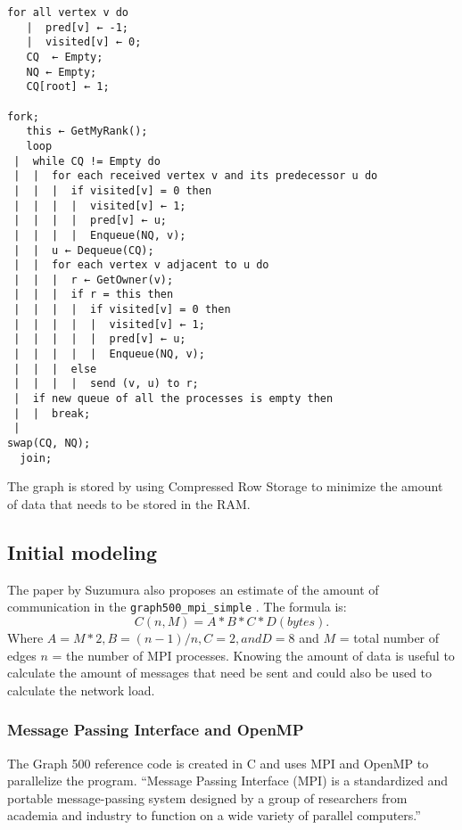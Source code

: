 \begin{lstlisting}[label={code:pseudo-simple},caption={Pseudo code taken from paper \cite{suzumura2011performance}}]
for all vertex v do 
   |  pred[v] ← -1; 
   |  visited[v] ← 0; 
   CQ  ← Empty; 
   NQ ← Empty; 
   CQ[root] ← 1; 
   
fork;
   this ← GetMyRank(); 
   loop 
 |  while CQ != Empty do 
 |  |  for each received vertex v and its predecessor u do 
 |  |  |  if visited[v] = 0 then 
 |  |  |  |  visited[v] ← 1; 
 |  |  |  |  pred[v] ← u; 
 |  |  |  |  Enqueue(NQ, v); 
 |  |  u ← Dequeue(CQ); 
 |  |  for each vertex v adjacent to u do 
 |  |  |  r ← GetOwner(v); 
 |  |  |  if r = this then 
 |  |  |  |  if visited[v] = 0 then 
 |  |  |  |  |  visited[v] ← 1; 
 |  |  |  |  |  pred[v] ← u; 
 |  |  |  |  |  Enqueue(NQ, v); 
 |  |  |  else 
 |  |  |  |  send (v, u) to r; 
 |  if new queue of all the processes is empty then 
 |  |  break; 
 |  
swap(CQ, NQ); 
  join;
\end{lstlisting}

The graph is stored by using Compressed Row Storage\cite{crs} to minimize the amount of data that needs to be stored in the RAM. 

\subsection*{Initial modeling}
The paper by Suzumura \cite{suzumura2011performance} also proposes an estimate of the amount of communication in the \texttt{graph500\_mpi\_simple} . The formula is:
\begin{equation}
\label{eq:communication_size}
C(n, M) = A * B * C * D (bytes).
\end{equation}
Where $A = M*2, B = (n-1)/n, C=2, and D=8$ and $M$ = total number of edges $n$ = the number of MPI processes.
Knowing the amount of data is useful to calculate the amount of messages that need be sent and could also be used to calculate the network load.

\subsubsection{Message Passing Interface and OpenMP}
\label{mpiopenmp}
The Graph 500 reference code is created in C and uses MPI and OpenMP to parallelize the program.
``Message Passing Interface (MPI) is a standardized and portable message-passing system designed by a group of researchers from academia and industry to function on a wide variety of parallel computers.\cite{mpi}''

